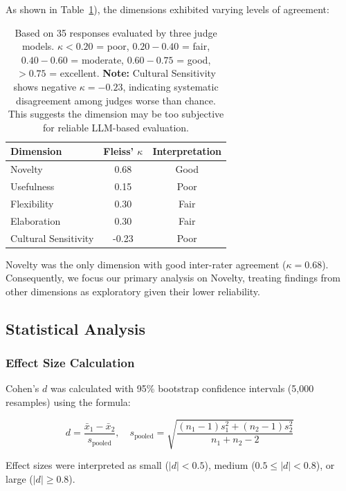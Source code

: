 \documentclass{article}
\begin{document}
As shown in Table~\ref{tab:inter_rater}), the dimensions exhibited varying levels of agreement:

\begin{table}[H]
\centering
\caption{Inter-Rater Reliability (Fleiss' Kappa) by Dimension}
\label{tab:inter_rater}
\begin{tabular}{lcc}
\toprule
\textbf{Dimension} & \textbf{Fleiss' \(\kappa\)} & \textbf{Interpretation} \\
\midrule
Novelty & 0.68 & Good \\
Usefulness & 0.15 & Poor \\
Flexibility & 0.30 & Fair \\
Elaboration & 0.30 & Fair \\
Cultural Sensitivity & -0.23 & Poor \\
\bottomrule
\end{tabular}
\caption*{\footnotesize Based on 35 responses evaluated by three judge models. \(\kappa < 0.20\) = poor, \(0.20-0.40\) = fair, \(0.40-0.60\) = moderate, \(0.60-0.75\) = good, \(>0.75\) = excellent. \textbf{Note:} Cultural Sensitivity shows negative \(\kappa = -0.23\), indicating systematic disagreement among judges worse than chance. This suggests the dimension may be too subjective for reliable LLM-based evaluation.}
\end{table}

Novelty was the only dimension with good inter-rater agreement (\(\kappa = 0.68\)). Consequently, we focus our primary analysis on Novelty, treating findings from other dimensions as exploratory given their lower reliability.

\subsection{Statistical Analysis}

\subsubsection{Effect Size Calculation}

Cohen's $d$ was calculated with 95\% bootstrap confidence intervals (5,000 resamples) using the formula:

\begin{equation}
d = \frac{\bar{x}_1 - \bar{x}_2}{s_{\text{pooled}}}, \quad s_{\text{pooled}} = \sqrt{\frac{(n_1-1)s_1^2 + (n_2-1)s_2^2}{n_1 + n_2 - 2}}
\end{equation}

Effect sizes were interpreted as small ($|d| < 0.5$), medium ($0.5 \le |d| < 0.8$), or large ($|d| \ge 0.8$).
\end{document}
